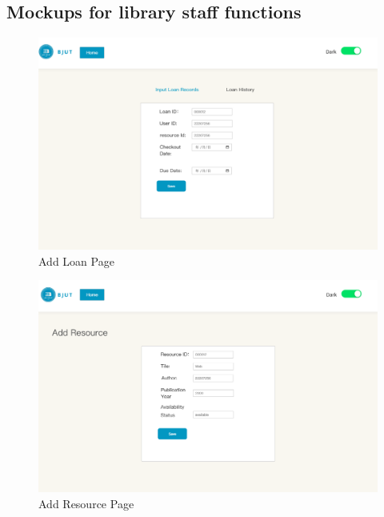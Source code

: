 \documentclass[12pt]{article}
\begin{document}
\subsection{Mockups for library staff functions}

\begin{figure}[H]
    \centering
    \includegraphics[width=\textwidth]{mockups/library/addloan.png}
    \caption{Add Loan Page}
    \label{fig:library_addloan_page}
\end{figure}

\begin{figure}[H]
    \centering
    \includegraphics[width=\textwidth]{mockups/library/addresource.png}
    \caption{Add Resource Page}
    \label{fig:library_addresource_page}
\end{figure}
\end{document}
